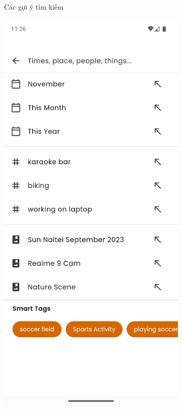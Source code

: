 \begin{figure}[H]
\begin{subfigure}{0.32\textwidth}
        \caption{Các gợi ý tìm kiếm}
    \end{subfigure}
    \hfill
    \begin{subfigure}{0.32\textwidth}
        \includegraphics[width=1\linewidth]{figures/c4/4-2/search_2.png} 

\end{subfigure}
\end{figure}
